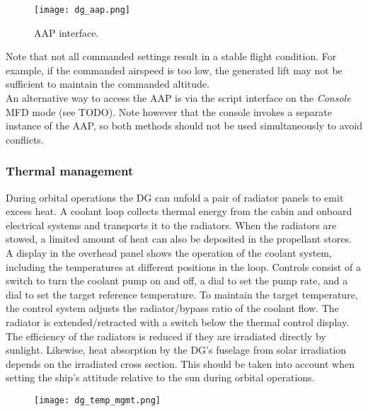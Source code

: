 \documentclass[Orbiter User Manual.tex]{subfiles}
\begin{document}
\begin{figure}[H]
  \centering
  \texttt{[image: dg\_aap.png]}
  \caption{AAP interface.}
\end{figure}

\noindent
Note that not all commanded settings result in a stable flight condition. For example, if the commanded airspeed is too low, the generated lift may not be sufficient to maintain the commanded altitude.\\
An alternative way to access the AAP is via the script interface on the \textit{Console} MFD mode (see TODO). Note however that the console invokes a separate instance of the AAP, so both methods should not be used simultaneously to avoid conflicts.

\subsubsection{Thermal management}
During orbital operations the DG can unfold a pair of radiator panels to emit excess heat. A coolant loop collects thermal energy from the cabin and onboard electrical systems and transports it to the radiators. When the radiators are stowed, a limited amount of heat can also be deposited in the propellant stores. A display in the overhead panel shows the operation of the coolant system, including the temperatures at different positions in the loop. Controls consist of a switch to turn the coolant pump on and off, a dial to set the pump rate, and a dial to set the target reference temperature. To maintain the target temperature, the control system adjusts the radiator/bypass ratio of the coolant flow. The radiator is extended/retracted with a switch below the thermal control display. The efficiency of the radiators is reduced if they are irradiated directly by sunlight. Likewise, heat absorption by the DG's fuselage from solar irradiation depends on the irradiated cross section. This should be taken into account when setting the ship's attitude relative to the sun during orbital operations.

\begin{figure}[H]
  \centering
  \texttt{[image: dg\_temp\_mgmt.png]}
\end{figure}
\end{document}
